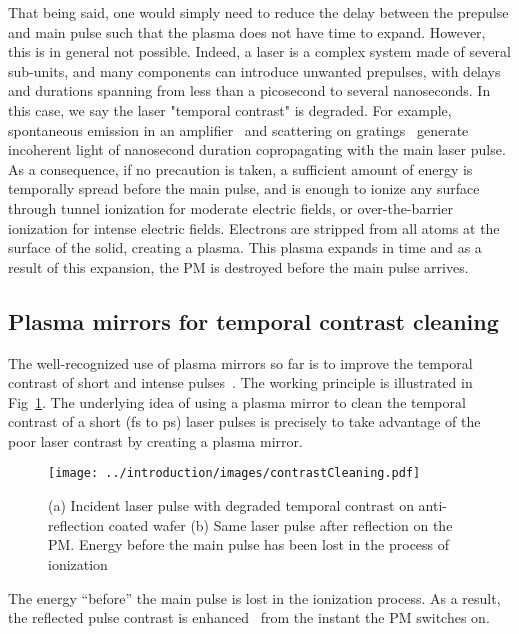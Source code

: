 \noindent That being said, one would simply need to reduce the delay between the prepulse and main pulse such that the plasma does not have time to expand. However, this is in general not possible.  Indeed, a laser is a complex system made of several sub-units, and many components can introduce unwanted prepulses, with delays and durations spanning from less than a picosecond to several nanoseconds. In this case, we say the laser "temporal contrast" is degraded. For example, spontaneous emission in an amplifier~\cite{nantel1998temporal} and scattering on gratings~\cite{yan2009optimization} generate incoherent light of nanosecond duration copropagating with the main laser pulse. As a consequence, if no precaution is taken, a sufficient amount of energy is temporally spread before the main pulse, and is enough to ionize any surface through tunnel ionization for moderate electric fields, or over-the-barrier ionization for intense electric fields. Electrons are stripped from  all atoms at the surface of the solid, creating a plasma. This plasma expands in time and as a result of this expansion, the PM is destroyed before the main pulse arrives.\\


\subsection{Plasma mirrors for temporal contrast cleaning}

\noindent The well-recognized use of plasma mirrors so far is to improve the temporal contrast of short and intense pulses~\cite{Kapteyn1991}. The working principle is illustrated in Fig~\ref{fig:contrastCleaning}.  The underlying idea of using a plasma mirror to clean the temporal contrast of a short (fs to ps) laser pulses is precisely to take advantage of the poor laser contrast by creating a plasma mirror. 

\begin{figure}[H]
\begin{center}
\texttt{[image: ../introduction/images/contrastCleaning.pdf]}\\
\caption{\label{fig:contrastCleaning} (a) Incident laser pulse with degraded temporal contrast on anti-reflection coated wafer (b) Same laser pulse after reflection on the PM. Energy before the main pulse has been lost in the process of ionization}
\end{center}
\end{figure}

\noindent The energy ``before'' the main pulse is lost in the ionization process. As a result, the reflected pulse contrast is enhanced~\cite{doumy2004complete} from the instant the PM switches on. 
 



